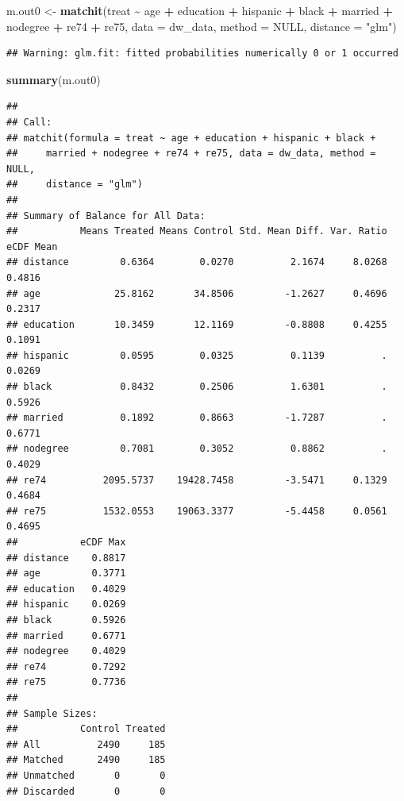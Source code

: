 \documentclass[
]{article}
\newenvironment{Shaded}{\begin{snugshade}}{\end{snugshade}}
\newcommand{\AttributeTok}[1]{\textcolor[rgb]{0.13,0.29,0.53}{#1}}
\newcommand{\ConstantTok}[1]{\textcolor[rgb]{0.56,0.35,0.01}{#1}}
\newcommand{\FunctionTok}[1]{\textcolor[rgb]{0.13,0.29,0.53}{\textbf{#1}}}
\newcommand{\NormalTok}[1]{#1}
\newcommand{\OtherTok}[1]{\textcolor[rgb]{0.56,0.35,0.01}{#1}}
\newcommand{\SpecialCharTok}[1]{\textcolor[rgb]{0.81,0.36,0.00}{\textbf{#1}}}
\newcommand{\StringTok}[1]{\textcolor[rgb]{0.31,0.60,0.02}{#1}}
\begin{document}
\begin{Shaded}
\begin{Highlighting}[]
\NormalTok{m.out0 }\OtherTok{\textless{}{-}} \FunctionTok{matchit}\NormalTok{(treat }\SpecialCharTok{\textasciitilde{}}\NormalTok{ age }\SpecialCharTok{+}\NormalTok{ education }\SpecialCharTok{+}\NormalTok{ hispanic }\SpecialCharTok{+}\NormalTok{ black }\SpecialCharTok{+}\NormalTok{ married }\SpecialCharTok{+}\NormalTok{ nodegree }\SpecialCharTok{+}\NormalTok{ re74 }\SpecialCharTok{+}\NormalTok{ re75,}
                  \AttributeTok{data =}\NormalTok{ dw\_data,}
                  \AttributeTok{method =} \ConstantTok{NULL}\NormalTok{,}
                  \AttributeTok{distance =} \StringTok{"glm"}\NormalTok{)}
\end{Highlighting}
\end{Shaded}

\begin{verbatim}
## Warning: glm.fit: fitted probabilities numerically 0 or 1 occurred
\end{verbatim}

\begin{Shaded}
\begin{Highlighting}[]
\FunctionTok{summary}\NormalTok{(m.out0)}
\end{Highlighting}
\end{Shaded}

\begin{verbatim}
## 
## Call:
## matchit(formula = treat ~ age + education + hispanic + black + 
##     married + nodegree + re74 + re75, data = dw_data, method = NULL, 
##     distance = "glm")
## 
## Summary of Balance for All Data:
##           Means Treated Means Control Std. Mean Diff. Var. Ratio eCDF Mean
## distance         0.6364        0.0270          2.1674     8.0268    0.4816
## age             25.8162       34.8506         -1.2627     0.4696    0.2317
## education       10.3459       12.1169         -0.8808     0.4255    0.1091
## hispanic         0.0595        0.0325          0.1139          .    0.0269
## black            0.8432        0.2506          1.6301          .    0.5926
## married          0.1892        0.8663         -1.7287          .    0.6771
## nodegree         0.7081        0.3052          0.8862          .    0.4029
## re74          2095.5737    19428.7458         -3.5471     0.1329    0.4684
## re75          1532.0553    19063.3377         -5.4458     0.0561    0.4695
##           eCDF Max
## distance    0.8817
## age         0.3771
## education   0.4029
## hispanic    0.0269
## black       0.5926
## married     0.6771
## nodegree    0.4029
## re74        0.7292
## re75        0.7736
## 
## Sample Sizes:
##           Control Treated
## All          2490     185
## Matched      2490     185
## Unmatched       0       0
## Discarded       0       0
\end{verbatim}
\end{document}
